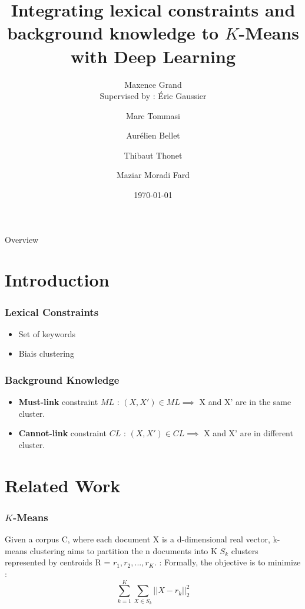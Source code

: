 \documentclass{beamer}
\begin{document}
\title{Integrating lexical constraints and background knowledge to $K$-Means with Deep Learning}
\author{Maxence Grand \\                                                   
        Supervised by : \'Eric Gaussier  \and Marc Tommasi \and Aur\'elien Bellet \and Thibaut Thonet \and Maziar Moradi Fard} 
\date{\today}

\maketitle

\begin{frame}{Overview}
\tableofcontents
\end{frame}
\section{Introduction}

\begin{frame}
  \frametitle{Lexical Constraints}
  \pause
  \begin{itemize}
    \setlength\itemsep{2em}
  \item Set of keywords \pause
  \item Biais clustering
  \end{itemize}
\end{frame}
\begin{frame}
\frametitle{Background Knowledge}
\begin{itemize}
\pause
\item \textbf{Must-link} constraint $ML$ : $(X, X') \in ML \implies $ X and X' are in the
  same cluster.\pause
\item \textbf{Cannot-link} constraint $CL$ : $(X, X') \in CL \implies $ X and X' are in
  different cluster.
\end{itemize}
\end{frame}

\section{Related Work}

\begin{frame}
\frametitle{$K$-Means}
Given a corpus C, where each document X is a 
d-dimensional real vector, k-means clustering aims to partition the n 
documents into K $S_k$ clusters represented by centroids 
R = {$r_1, r_2, ..., r_K$}. :
Formally, the objective is to minimize :
$$
\sum_{k =1 }^K \sum_{X \in S_k} ||X - r_k||_2^2
$$
\end{frame}
\end{document}
